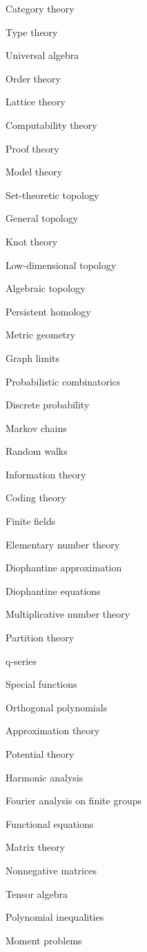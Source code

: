 \item Category theory
\item Type theory
\item Universal algebra
\item Order theory
\item Lattice theory
\item Computability theory
\item Proof theory
\item Model theory
\item Set-theoretic topology
\item General topology
\item Knot theory
\item Low-dimensional topology
\item Algebraic topology
\item Persistent homology
\item Metric geometry
\item Graph limits
\item Probabilistic combinatorics
\item Discrete probability
\item Markov chains
\item Random walks
\item Information theory
\item Coding theory
\item Finite fields
\item Elementary number theory
\item Diophantine approximation
\item Diophantine equations
\item Multiplicative number theory
\item Partition theory
\item q-series
\item Special functions
\item Orthogonal polynomials
\item Approximation theory
\item Potential theory
\item Harmonic analysis
\item Fourier analysis on finite groups
\item Functional equations
\item Matrix theory
\item Nonnegative matrices
\item Tensor algebra
\item Polynomial inequalities
\item Moment problems
